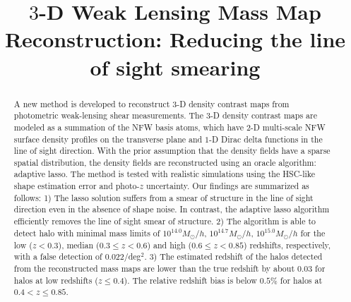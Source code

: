 \documentclass[twocolumn]{aastex62}
\begin{document}
\title{$3$-D Weak Lensing Mass Map Reconstruction:
Reducing the line of sight smearing}

\begin{abstract}
A new method is developed to reconstruct $3$-D density contrast maps from
photometric weak-lensing shear measurements. The $3$-D density contrast maps
are modeled as a summation of the NFW basis atoms, which have $2$-D multi-scale
NFW surface density profiles on the transverse plane and $1$-D Dirac delta
functions in the line of sight direction. With the prior assumption that the
density fields have a sparse spatial distribution, the density fields are
reconstructed using an oracle algorithm: adaptive lasso. The method is tested
with realistic simulations using the HSC-like shape estimation error and
photo-$z$ uncertainty.  Our findings are summarized as follows: 1) The lasso
solution suffers from a smear of structure in the line of sight direction even
in the absence of shape noise. In contrast, the adaptive lasso algorithm
efficiently removes the line of sight smear of structure.  2) The algorithm is
able to detect halo with minimal mass limits of $10^{14.0} M_{\odot}/h$,
$10^{14.7} M_{\odot}/h$, $10^{15.0} M_{\odot}/h$ for the low ($z<0.3$), median
($0.3\leq z< 0.6$) and high ($0.6\leq z< 0.85$) redshifts, respectively, with a
false detection of 0.022/deg$^2$.  3) The estimated redshift of the halos
detected from the reconstructed mass maps are lower than the true redshift by
about $0.03$ for halos at low redshifts ($z\leq 0.4$). The relative redshift
bias is below $0.5\%$ for halos at $0.4<z\leq 0.85$.
\end{abstract}
\end{document}
